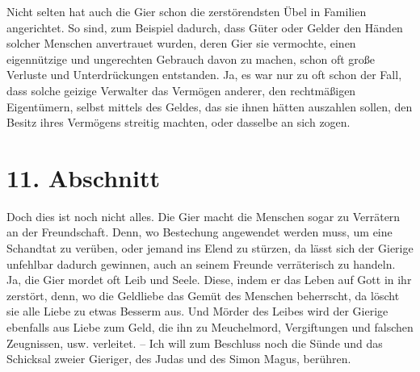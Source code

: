 Nicht selten hat auch die Gier schon die zerstörendsten Übel in Familien
angerichtet. So sind, zum Beispiel dadurch, dass Güter oder Gelder den Händen solcher
Menschen anvertrauet wurden, deren Gier sie vermochte, einen eigennützige und
ungerechten Gebrauch davon zu machen, schon oft große Verluste und
Unterdrückungen entstanden. Ja, es war nur zu oft schon der Fall, dass solche
geizige Verwalter das Vermögen anderer, den rechtmäßigen Eigentümern, selbst
mittels des Geldes, das sie ihnen hätten auszahlen sollen, den Besitz ihres
Vermögens streitig machten, oder dasselbe an sich zogen.

\section{11. Abschnitt} \label{kap13_ab11}

Doch dies ist noch nicht alles. Die Gier macht die Menschen sogar zu Verrätern
an der Freundschaft. Denn, wo Bestechung angewendet werden
muss, um eine
Schandtat zu verüben, oder jemand ins Elend zu stürzen, da lässt sich der
Gierige unfehlbar dadurch gewinnen, auch an seinem Freunde verräterisch zu
handeln. Ja, die Gier mordet oft Leib und Seele. Diese, indem er das Leben auf
Gott in ihr zerstört, denn, wo die Geldliebe das Gemüt des Menschen
beherrscht, da löscht sie alle Liebe zu etwas Besserm aus. Und
Mörder des Leibes
wird der Gierige ebenfalls aus Liebe zum Geld, die ihn zu Meuchelmord,
Vergiftungen und falschen Zeugnissen, usw. verleitet. -- Ich will zum
Beschluss noch die Sünde und das Schicksal zweier Gieriger, des
Judas und des
Simon Magus, berühren.

\medskip

